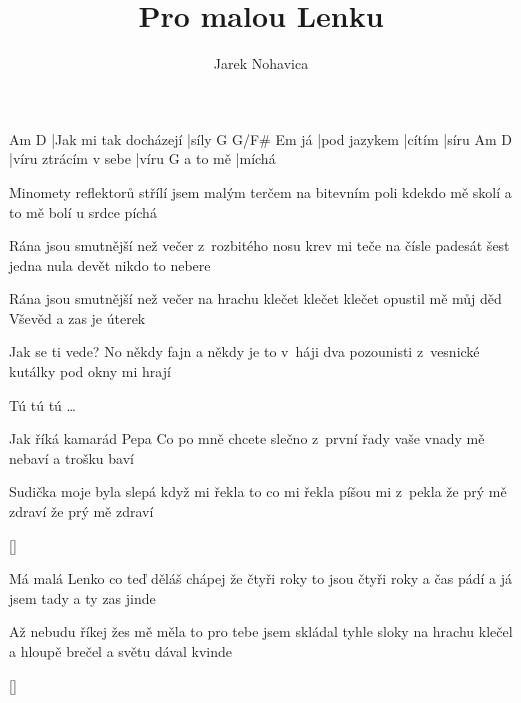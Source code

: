 \documentclass{song}
\author{Jarek Nohavica}
\title{Pro malou Lenku}
\begin{document}
\begin{multicols}{2}
\strophe
Am\7                  D\7
|Jak mi tak docházejí |síly
   G            G/F\#  Em
já |pod jazykem |cítím |síru
Am\7                 D\7
|víru ztrácím v sebe |víru
        G
a to mě |míchá
\endstrophe

\columnbreak
\strophe*
Minomety reflektorů střílí
jsem malým terčem na bitevním poli
kdekdo mě skolí a to mě bolí
u srdce píchá
\endstrophe
\end{multicols}

Rána jsou smutnější než večer
z~rozbitého nosu krev mi teče
na čísle padesát šest jedna nula devět
nikdo to nebere

Rána jsou smutnější než večer
na hrachu klečet klečet klečet
opustil mě můj děd Vševěd
a zas je úterek

Jak se ti vede?
No někdy fajn a někdy je to v~háji
dva pozounisti z~vesnické kutálky
pod okny mi hrají

Tú tú tú \ldots
\endstrophe

\begin{multicols}{2}
\strophe*
Jak říká kamarád Pepa
Co po mně chcete slečno z~první řady
vaše vnady mě nebaví
a trošku baví
\endstrophe

\strophe*
Sudička moje byla slepá
když mi řekla to co mi řekla
píšou mi z~pekla že prý mě zdraví
že prý mě zdraví
\endstrophe
\end{multicols}

\ref{}

\begin{multicols}{2}
\strophe*
Má malá Lenko co teď děláš
chápej že čtyři roky to jsou čtyři roky
a čas pádí a já jsem tady
a ty zas jinde
\endstrophe

\strophe*
Až nebudu říkej žes mě měla
to pro tebe jsem skládal tyhle sloky
na hrachu klečel a hloupě brečel
a světu dával kvinde
\endstrophe
\end{multicols}

\ref{}
\end{document}
